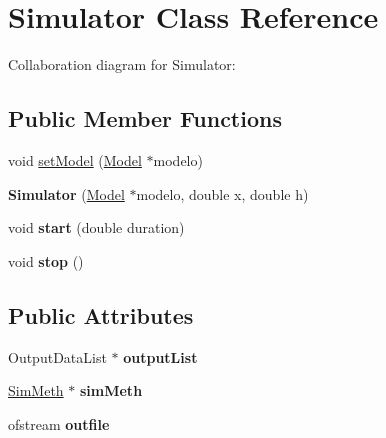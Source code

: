 \hypertarget{classSimulator}{}\section{Simulator Class Reference}
\label{classSimulator}


Collaboration diagram for Simulator\+:
\subsection*{Public Member Functions}
\begin{DoxyCompactItemize}
\item 
void \hyperlink{classSimulator_a4e807cb89047c6b3e22f43e08f47e698}{set\+Model} (\hyperlink{classModel}{Model} $\ast$modelo)
\item 
{\bfseries Simulator} (\hyperlink{classModel}{Model} $\ast$modelo, double x, double h)\hypertarget{classSimulator_a26e2b1924b471f44435e720dc0c01bea}{}\label{classSimulator_a26e2b1924b471f44435e720dc0c01bea}

\item 
void {\bfseries start} (double duration)\hypertarget{classSimulator_a4263177599f3743a988d87ed92b7cbe0}{}\label{classSimulator_a4263177599f3743a988d87ed92b7cbe0}

\item 
void {\bfseries stop} ()\hypertarget{classSimulator_aa33259e44ccd34588e5eb78e03fee2a0}{}\label{classSimulator_aa33259e44ccd34588e5eb78e03fee2a0}

\end{DoxyCompactItemize}
\subsection*{Public Attributes}
\begin{DoxyCompactItemize}
\item 
Output\+Data\+List $\ast$ {\bfseries output\+List}\hypertarget{classSimulator_a6ff313b1c12a9b0eb7e2d308b49ecfef}{}\label{classSimulator_a6ff313b1c12a9b0eb7e2d308b49ecfef}

\item 
\hyperlink{classSimMeth}{Sim\+Meth} $\ast$ {\bfseries sim\+Meth}\hypertarget{classSimulator_a80d13839dd06c41ff84c5297c9aaa97b}{}\label{classSimulator_a80d13839dd06c41ff84c5297c9aaa97b}

\item 
ofstream {\bfseries outfile}\hypertarget{classSimulator_a622604a97edba49aa2361fb9ea1fbafa}{}\label{classSimulator_a622604a97edba49aa2361fb9ea1fbafa}

\end{DoxyCompactItemize}
